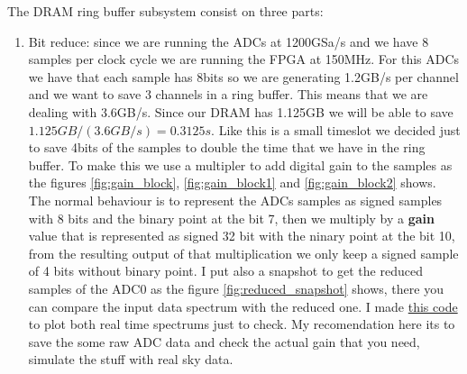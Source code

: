The DRAM ring buffer subsystem consist on three parts:
\begin{enumerate}
    \item Bit reduce: since we are running the ADCs at 1200GSa/s and we have 8 samples per clock cycle we are running the FPGA at 150MHz. For this ADCs we have that each sample has 8bits so we are generating 1.2GB/s per channel and we want to save 3 channels in a ring buffer. This means that we are dealing with 3.6GB/s. Since our DRAM has 1.125GB we will be able to save $1.125GB/(3.6GB/s)=0.3125s$.  Like this is a small timeslot we decided just to save 4bits of the samples to double the time that we have in the ring buffer.
        To make this we use a multipler to add digital gain to the samples as the figures \ref{fig:gain_block}, \ref{fig:gain_block1} and \ref{fig:gain_block2} shows. The normal behaviour is to represent the ADCs samples as signed samples with 8 bits and the binary point at the bit 7, then we multiply by a \textbf{gain} value that is represented as signed 32 bit with the ninary point at the bit 10, from the resulting output of that multiplication we only keep a signed sample of 4 bits without  binary point.
 I put also a snapshot to get the reduced samples of the ADC0 as the figure \ref{fig:reduced_snapshot} shows, there you can compare the input data spectrum with the reduced one. I made \href{https://github.com/sebajor/ARTE-control/blob/main/codes/dram_bit_usage.py}{this code} to plot both real time spectrums just to check. My recomendation here its to save the some raw ADC data and check the actual gain that you need, simulate the stuff with real sky data. 



\end{enumerate}
